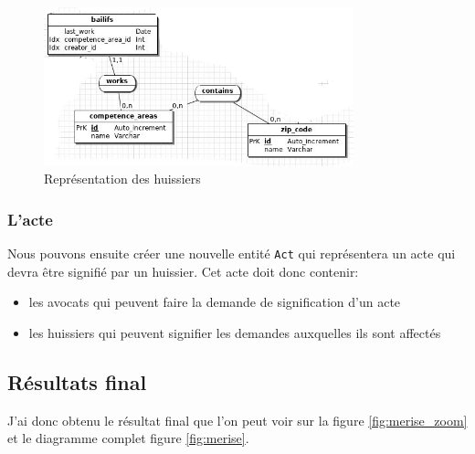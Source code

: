 \documentclass[]{report}
\begin{document}
        \begin{figure}[h!]
          \centering
          \includegraphics[width=0.8\textwidth]{img/merise_bailiffs.png}
          \caption{Représentation des huissiers}
          \label{fig:merise_bailiffs}
        \end{figure}

      \subsubsection{L'acte}

        Nous pouvons ensuite créer une nouvelle entité \verb|Act| qui représentera un acte qui devra être signifié par un huissier. Cet acte doit donc contenir:

        \begin{itemize}
          \item les avocats qui peuvent faire la demande de signification d'un acte
          \item les huissiers qui peuvent signifier les demandes auxquelles ils sont affectés
        \end{itemize}

    \subsection{Résultats final}

      J'ai donc obtenu le résultat final que l'on peut voir sur la figure \ref{fig:merise_zoom} et le diagramme complet figure \ref{fig:merise}.
\end{document}
